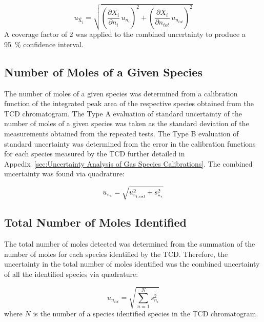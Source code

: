 \documentclass[12pt]{article}
\begin{document}
\begin{equation}
\label{eq:Volume_Frac_Uncertainty}
u_\mathrm{\bar{X_{i}}} = \sqrt{{\left( \frac{\partial \bar{X_{i}}}{\partial n_{i}}\,u_{\scriptscriptstyle n_{i}} \right)}^2+{\left(\frac{\partial \bar{X_{i}}}{\partial n_{tot}}\,u_{\scriptscriptstyle n_{tot}}\right)}^2}
\end{equation}
A coverage factor of 2 was applied to the combined uncertainty to produce a 95~\% confidence interval.

\subsection{Number of Moles of a Given Species}
\label{ssec:Number_of_Moles_of_a_Given_Species}

The number of moles of a given species was determined from a calibration function of the integrated peak area of the respective species obtained from the TCD chromatogram. The Type A evaluation of standard uncertainty of the number of moles of a given species was taken as the standard deviation of the measurements obtained from the repeated tests. The Type B evaluation of standard uncertainty was determined from the error in the calibration functions for each species measured by the TCD further detailed in Appedix~\ref{sec:Uncertainty Analysis of Gas Species Calibrations}. The combined uncertainty was found via quadrature:

\begin{equation}
\label{eq:gasspeciesuncertaintycertainty}
u_{\scriptscriptstyle n_{i}} = \sqrt{ u_{\rm \scriptscriptstyle n_{i,cal}}^2 + s_{\scriptscriptstyle n_{i}}^2}
\end{equation}

\subsection{Total Number of Moles Identified}
\label{ssec:Total Number of Moles Identified}
The total number of moles detected was determined from the summation of the number of moles for each species identified by the TCD. Therefore, the uncertainty in the total number of moles identified was the combined uncertainty of all the identified species via quadrature:

\begin{equation}
\label{eq:totalnumberofmolesdetected}
u_{\scriptscriptstyle n_{tot}}=\sqrt{{\sum_{n=1}^{N} s_{\scriptscriptstyle n_{i}}^2}}
\end{equation}
where $N$ is the number of a species identified species in the TCD chromatogram.
\end{document}
